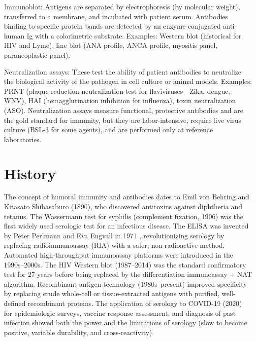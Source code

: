 Immunoblot: Antigens are separated by electrophoresis (by molecular weight), transferred to a membrane, and incubated with patient serum. Antibodies binding to specific protein bands are detected by an enzyme-conjugated anti-human Ig with a colorimetric substrate. Examples: Western blot (historical for HIV and Lyme), line blot (ANA profile, ANCA profile, myositis panel, paraneoplastic panel).

Neutralization assays: These test the ability of patient antibodies to neutralize the biological activity of the pathogen in cell culture or animal models. Examples: PRNT (plaque reduction neutralization test for flaviviruses---Zika, dengue, WNV), HAI (hemagglutination inhibition for influenza), toxin neutralization (ASO). Neutralization assays measure functional, protective antibodies and are the gold standard for immunity, but they are labor-intensive, require live virus culture (BSL-3 for some agents), and are performed only at reference laboratories.

\section*{History}
The concept of humoral immunity and antibodies dates to Emil von Behring and Kitasato Shibasaburō (1890), who discovered antitoxins against diphtheria and tetanus. The Wassermann test for syphilis (complement fixation, 1906) was the first widely used serologic test for an infectious disease. The ELISA was invented by Peter Perlmann and Eva Engvall in 1971 \cite{engvall1971elisa}, revolutionizing serology by replacing radioimmunoassay (RIA) with a safer, non-radioactive method. Automated high-throughput immunoassay platforms were introduced in the 1990s--2000s. The HIV Western blot (1987--2014) was the standard confirmatory test for 27 years before being replaced by the differentiation immunoassay + NAT algorithm. Recombinant antigen technology (1980s--present) improved specificity by replacing crude whole-cell or tissue-extracted antigens with purified, well-defined recombinant proteins. The application of serology to COVID-19 (2020) for epidemiologic surveys, vaccine response assessment, and diagnosis of past infection showed both the power and the limitations of serology (slow to become positive, variable durability, and cross-reactivity).


